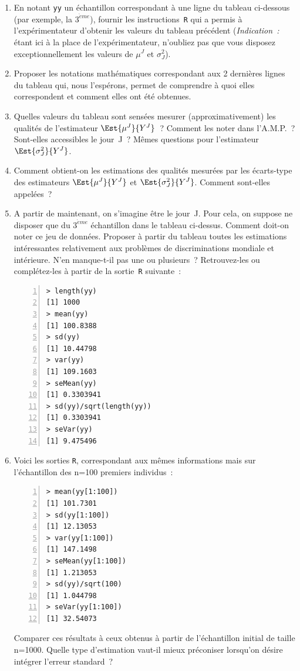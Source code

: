 \documentclass[10pt]{report}
\begin{document}
\begin{exercice}
\begin{enumerate}
\item En notant \texttt{yy} un échantillon correspondant à une ligne du tableau ci-dessous (par exemple, la $3^{\grave eme}$), fournir les instructions~\texttt{R} qui a permis à l'expérimentateur d'obtenir les valeurs du tableau précédent (\textit{Indication~:} étant ici à la place de l'expérimentateur, n'oubliez pas que vous disposez exceptionnellement les valeurs de $\mu^J$ et $\sigma^2_J$).
\item Proposer les notations mathématiques correspondant aux 2 dernières lignes du tableau qui, nous l'espérons, permet de comprendre à quoi elles correspondent et comment elles ont été obtenues.
\item Quelles valeurs du tableau sont sensées mesurer (approximativement) les qualités de l'estimateur $\Est{\mu^J}{Y^J}$~? Comment les noter dans l'A.M.P.~? Sont-elles accessibles le jour~J~? Mêmes questions pour l'estimateur $\Est{\sigma^2_J}{Y^J}$.
\item Comment obtient-on les estimations des qualités mesurées par les écarts-type des estimateurs $\Est{\mu^J}{Y^J}$ et $\Est{\sigma^2_J}{Y^J}$. Comment sont-elles appelées~?
\item A partir de maintenant, on s'imagine être le jour~J. Pour cela, on suppose ne disposer que du $3^{\grave eme}$ échantillon dans le tableau ci-dessus. Comment doit-on noter ce jeu de données. Proposer à partir du tableau toutes les estimations intéressantes relativement aux problèmes de discriminations mondiale et intérieure. N'en manque-t-il pas une ou plusieurs~?  Retrouvez-les ou complétez-les à partir de la sortie~\texttt{R} suivante~:
\begin{Verbatim}[frame=leftline,fontfamily=tt,fontshape=n,numbers=left]
> length(yy)
[1] 1000
> mean(yy)
[1] 100.8388
> sd(yy)
[1] 10.44798
> var(yy)
[1] 109.1603
> seMean(yy)
[1] 0.3303941
> sd(yy)/sqrt(length(yy))
[1] 0.3303941
> seVar(yy)
[1] 9.475496
\end{Verbatim}
 
\item Voici les sorties \texttt{R}, correspondant aux mêmes informations mais sur l'échantillon des n=100 premiers individus~: 
\begin{Verbatim}[frame=leftline,fontfamily=tt,fontshape=n,numbers=left]
> mean(yy[1:100])
[1] 101.7301
> sd(yy[1:100])
[1] 12.13053
> var(yy[1:100])
[1] 147.1498
> seMean(yy[1:100])
[1] 1.213053
> sd(yy)/sqrt(100)
[1] 1.044798
> seVar(yy[1:100])
[1] 32.54073
\end{Verbatim}

Comparer ces résultats à ceux obtenus à partir de l'échantillon initial de taille n=1000. Quelle type d'estimation vaut-il mieux préconiser lorsqu'on désire intégrer l'erreur standard~?
\end{enumerate}
\end{exercice}
\end{document}
